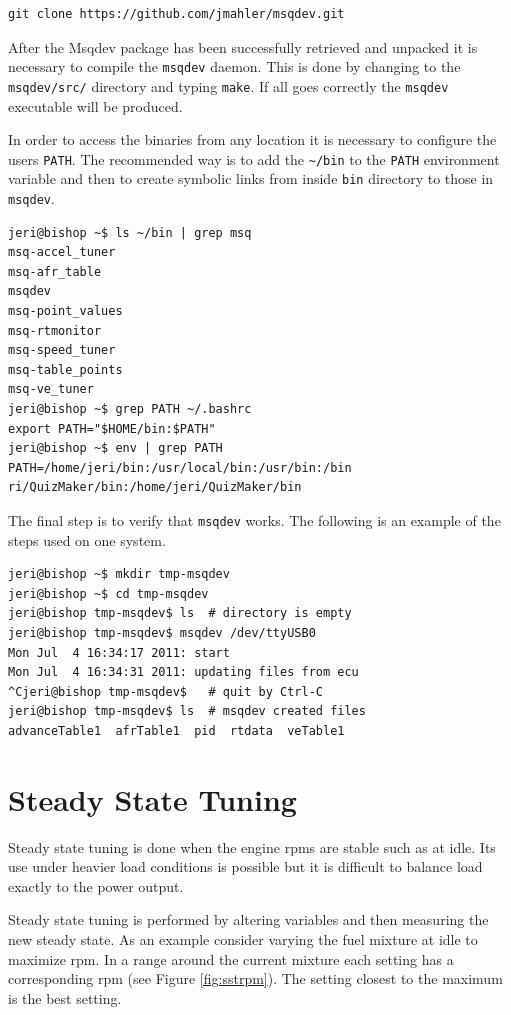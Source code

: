 \documentclass{article}
\begin{document}
\begin{verbatim}
git clone https://github.com/jmahler/msqdev.git
\end{verbatim}

After the Msqdev package has been successfully retrieved and unpacked
it is necessary to compile the \verb+msqdev+ daemon.
This is done by changing to the \verb+msqdev/src/+ directory and typing
\verb+make+.
If all goes correctly the \verb+msqdev+ executable will be produced.

In order to access the binaries from any location it is necessary to
configure the users \verb+PATH+.
The recommended way is to add the \verb+~/bin+ to the \verb+PATH+ environment
variable and then to create symbolic links from inside \verb+bin+ directory
to those in \verb+msqdev+.

\begin{verbatim}
jeri@bishop ~$ ls ~/bin | grep msq
msq-accel_tuner
msq-afr_table
msqdev
msq-point_values
msq-rtmonitor
msq-speed_tuner
msq-table_points
msq-ve_tuner
jeri@bishop ~$ grep PATH ~/.bashrc
export PATH="$HOME/bin:$PATH"
jeri@bishop ~$ env | grep PATH
PATH=/home/jeri/bin:/usr/local/bin:/usr/bin:/bin
ri/QuizMaker/bin:/home/jeri/QuizMaker/bin
\end{verbatim}

The final step is to verify that \verb+msqdev+ works.
The following is an example of the steps used on one system.

\begin{verbatim}
jeri@bishop ~$ mkdir tmp-msqdev
jeri@bishop ~$ cd tmp-msqdev
jeri@bishop tmp-msqdev$ ls  # directory is empty
jeri@bishop tmp-msqdev$ msqdev /dev/ttyUSB0 
Mon Jul  4 16:34:17 2011: start
Mon Jul  4 16:34:31 2011: updating files from ecu
^Cjeri@bishop tmp-msqdev$   # quit by Ctrl-C
jeri@bishop tmp-msqdev$ ls  # msqdev created files
advanceTable1  afrTable1  pid  rtdata  veTable1
\end{verbatim}

\section{Steady State Tuning}
\label{sec:steadytun}

Steady state tuning is done when the engine rpms are stable such as
at idle.
Its use under heavier load conditions is possible but it is difficult to
balance load exactly to the power output.

Steady state tuning is performed by altering variables and then measuring
the new steady state.
As an example consider varying the fuel mixture at idle to maximize rpm.
In a range around the current mixture each setting has a corresponding
rpm (see Figure \ref{fig:sstrpm}).
The setting closest to the maximum is the best setting.
\end{document}
